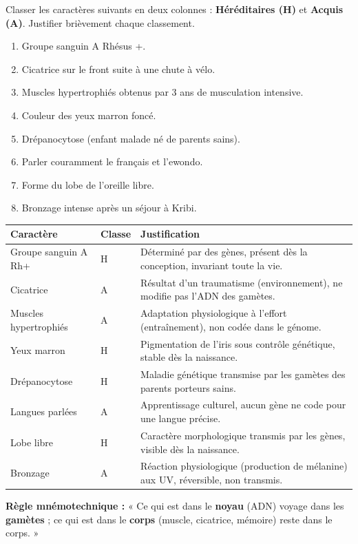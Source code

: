 \documentclass[11pt]{article}
\begin{document}
\begin{exercice}
Classer les caractères suivants en deux colonnes : \textbf{Héréditaires (H)} et \textbf{Acquis (A)}. Justifier brièvement chaque classement.
\begin{enumerate}
    \item Groupe sanguin A Rhésus +.
    \item Cicatrice sur le front suite à une chute à vélo.
    \item Muscles hypertrophiés obtenus par 3 ans de musculation intensive.
    \item Couleur des yeux marron foncé.
    \item Drépanocytose (enfant malade né de parents sains).
    \item Parler couramment le français et l'ewondo.
    \item Forme du lobe de l'oreille libre.
    \item Bronzage intense après un séjour à Kribi.
\end{enumerate}
\end{exercice}

\begin{corrige}
\begin{center}
\begin{tabularx}{\linewidth}{|l|l|X|}\hline
\textbf{Caractère} & \textbf{Classe} & \textbf{Justification} \\ \hline
Groupe sanguin A Rh+ & H & Déterminé par des gènes, présent dès la conception, invariant toute la vie. \\ \hline
Cicatrice & A & Résultat d'un traumatisme (environnement), ne modifie pas l'ADN des gamètes. \\ \hline
Muscles hypertrophiés & A & Adaptation physiologique à l'effort (entraînement), non codée dans le génome. \\ \hline
Yeux marron & H & Pigmentation de l'iris sous contrôle génétique, stable dès la naissance. \\ \hline
Drépanocytose & H & Maladie génétique transmise par les gamètes des parents porteurs sains. \\ \hline
Langues parlées & A & Apprentissage culturel, aucun gène ne code pour une langue précise. \\ \hline
Lobe libre & H & Caractère morphologique transmis par les gènes, visible dès la naissance. \\ \hline
Bronzage & A & Réaction physiologique (production de mélanine) aux UV, réversible, non transmis. \\ \hline
\end{tabularx}
\end{center}
\textbf{Règle mnémotechnique :} « Ce qui est dans le \textbf{noyau} (ADN) voyage dans les \textbf{gamètes} ; ce qui est dans le \textbf{corps} (muscle, cicatrice, mémoire) reste dans le corps. »
\end{corrige}
\end{document}
